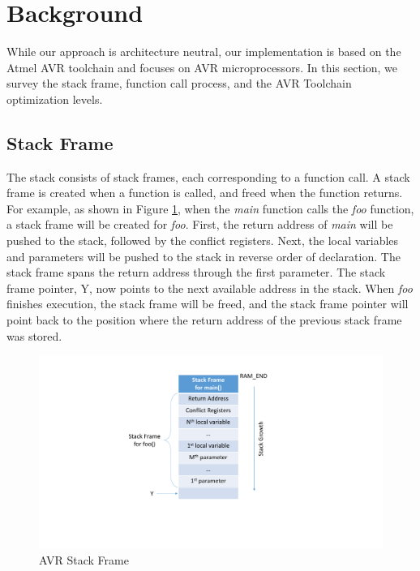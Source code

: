 \vspace{-20pt}
\section{Background}\label{sec:background}
\vspace{-10pt}
While our approach is architecture neutral, our implementation is based on the Atmel AVR toolchain and focuses on AVR microprocessors. In this section, we survey the stack frame, function call process, and the AVR Toolchain optimization levels.
\vspace{-10pt}
\subsection{Stack Frame}
\vspace{-10pt}
The stack consists of stack frames, each corresponding to a function call. A stack frame is created when a function is called, and freed when the function returns. For example, as shown in Figure \ref{fig:stack_frame}, when the \textit{main} function calls the \textit{foo} function, a stack frame will be created for \textit{foo}. First, the return address of \textit{main} will be pushed to the stack, followed by the conflict registers. Next, the local variables and parameters will be pushed to the stack in reverse order of declaration. The stack frame spans the return address through the first parameter. The stack frame pointer, Y, now points to the next available address in the stack. When \textit{foo} finishes execution, the stack frame will be freed, and the stack frame pointer will point back to the position where the return address of the previous stack frame was stored.
\vspace{-15pt}
\begin{figure}
\centering
\includegraphics[scale=0.55]{figures/stack_frame_v2.pdf}
\vspace{5pt}
\caption{AVR Stack Frame}
\label{fig:stack_frame}
\end{figure}
\vspace{-20pt}
\vspace{-10pt}
